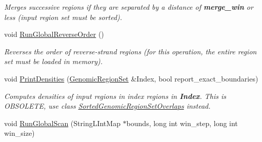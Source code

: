 \begin{DoxyCompactItemize}
\begin{DoxyCompactList}\small\item\em Merges successive regions if they are separated by a distance of {\bfseries merge\_\-win} or less (input region set must be sorted). \end{DoxyCompactList}\item 
\hypertarget{classGenomicRegionSet_a962bb1b26543df14b324d7ab4dd8e404}{
void \hyperlink{classGenomicRegionSet_a962bb1b26543df14b324d7ab4dd8e404}{RunGlobalReverseOrder} ()}
\label{classGenomicRegionSet_a962bb1b26543df14b324d7ab4dd8e404}

\begin{DoxyCompactList}\small\item\em Reverses the order of reverse-\/strand regions (for this operation, the entire region set must be loaded in memory). \end{DoxyCompactList}\item 
\hypertarget{classGenomicRegionSet_ab8abdbc3c1f4530dc1992fb0766ba5a4}{
void \hyperlink{classGenomicRegionSet_ab8abdbc3c1f4530dc1992fb0766ba5a4}{PrintDensities} (\hyperlink{classGenomicRegionSet}{GenomicRegionSet} \&Index, bool report\_\-exact\_\-boundaries)}
\label{classGenomicRegionSet_ab8abdbc3c1f4530dc1992fb0766ba5a4}

\begin{DoxyCompactList}\small\item\em Computes densities of input regions in index regions in {\bfseries Index}. This is OBSOLETE, use class \hyperlink{classSortedGenomicRegionSetOverlaps}{SortedGenomicRegionSetOverlaps} instead. \end{DoxyCompactList}\item 
\hypertarget{classGenomicRegionSet_a14610521cc47631b1459c2e3488b0eec}{
void \hyperlink{classGenomicRegionSet_a14610521cc47631b1459c2e3488b0eec}{RunGlobalScan} (StringLIntMap $\ast$bounds, long int win\_\-step, long int win\_\-size)}
\label{classGenomicRegionSet_a14610521cc47631b1459c2e3488b0eec}


\end{DoxyCompactItemize}
